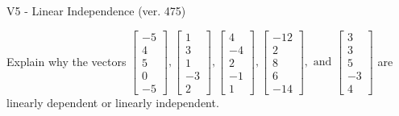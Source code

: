 \begin{exercise}
  \begin{exerciseTitle}V5 - Linear Independence (ver. 475)\end{exerciseTitle}
  \begin{exerciseStatement}
    Explain why the vectors \(\left[\begin{array}{r}
-5 \\
4 \\
5 \\
0 \\
-5
\end{array}\right] , \left[\begin{array}{r}
1 \\
3 \\
1 \\
-3 \\
2
\end{array}\right] , \left[\begin{array}{r}
4 \\
-4 \\
2 \\
-1 \\
1
\end{array}\right] , \left[\begin{array}{r}
-12 \\
2 \\
8 \\
6 \\
-14
\end{array}\right] , \text{ and } \left[\begin{array}{r}
3 \\
3 \\
5 \\
-3 \\
4
\end{array}\right]\) are linearly dependent or linearly independent.	



\end{exerciseStatement}
\end{exercise}
